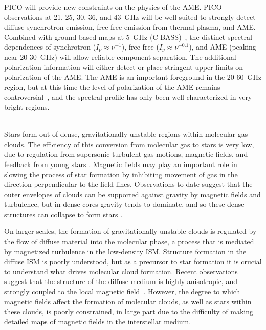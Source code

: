 \documentclass[PICOReport.tex]{subfiles}
\begin{document}
PICO will provide new constraints on the physics of the \ac{AME}. PICO observations at 21, 25, 30, 36, and 43~GHz will be well-suited to strongly detect diffuse synchrotron emission, free-free emission from thermal plasma, and \ac{AME}. Combined with ground-based maps at 5~GHz (C-BASS)~\citep{Dickinson2018a}, the distinct spectral dependences of synchrotron ($I_{\nu} \approx {\nu}^{-1}$), free-free ($I_{\nu} \approx {\nu}^{-0.1}$),  and \ac{AME} (peaking near 20-30~GHz) will allow reliable component separation. The additional polarization information will either detect or place stringent upper limits on polarization of the \ac{AME}. The \ac{AME} is an important foreground in the 20-60~GHz region, but at this time the level of polarization of the AME remains controversial~\cite{Dickinson2018b}, and the spectral profile has only been well-characterized in very bright regions.

\vspace{0.1in}
 \\
Stars form out of dense, gravitationally unstable regions within molecular gas clouds. The efficiency of this conversion from molecular gas to stars is very low, due to regulation from supersonic turbulent gas motions, magnetic fields, and feedback from young stars \citep{McKee2007}.  Magnetic fields may play an important role in slowing the process of star formation by inhibiting movement of gas in the direction perpendicular to the field lines.  Observations to date suggest that the outer envelopes of clouds can be supported against gravity by magnetic fields and turbulence, but in dense cores gravity tends to dominate, and so these dense structures can collapse to form stars \citep{Crutcher2010}.

On larger scales, the formation of gravitationally unstable clouds is regulated by the flow of diffuse material into the molecular phase, a process that is mediated by magnetized turbulence in the low-density \ac{ISM}. Structure formation in the diffuse \ac{ISM} is poorly understood, but as a precursor to star formation it is crucial to understand what drives molecular cloud formation. Recent observations suggest that the structure of the diffuse medium is highly anisotropic, and strongly coupled to the local magnetic field~\citep{Clark:2014, Clark:2015, Kalberla:2016, KalberlaKerp:2016}. However, the degree to which magnetic fields affect the formation of molecular clouds, as well as stars within these clouds, is poorly constrained, in large part due to the difficulty of making detailed maps of magnetic fields in the interstellar medium.
\end{document}
